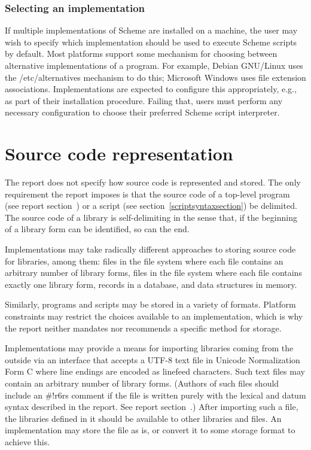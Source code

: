 \documentclass[twoside,twocolumn]{algol60}
\begin{document}
\subsection{Selecting an implementation}
If multiple implementations of Scheme are installed on a machine, the
user may wish to specify which implementation should be used to 
execute Scheme scripts by default.  Most platforms support some 
mechanism for choosing between alternative implementations of a 
program.  For example, Debian GNU/Linux uses the {\cf /etc/alternatives} 
mechanism to do this; Microsoft Windows uses file extension 
associations.  Implementations are expected to configure this 
appropriately, e.g., as part of their installation procedure.
Failing that, users must perform any necessary configuration to 
choose their preferred Scheme script interpreter.

\chapter{Source code representation}
\label{sourcecoderepappendix}

The report does not specify how source code is represented and stored.
The only requirement the report imposes is that the source code of a
top-level program (see report
section~) or a script (see section~\ref{scriptsyntaxsection}) be
delimited.  The source code of a library is self-delimiting in the
sense that, if the beginning of a library form can be identified, so
can the end.

Implementations may take radically different approaches to storing
source code for libraries, among them: files in the file system where
each file contains an arbitrary number of library forms, files in the
file system where each file contains exactly one library form, records
in a database, and data structures in memory.

Similarly, programs and scripts may be stored in a variety of
formats.  Platform constraints may restrict the choices available to
an implementation, which is why the report neither mandates nor
recommends a specific method for storage.

Implementations may provide a means for importing libraries coming
from the outside via an interface that accepts a UTF-8 text file in
Unicode Normalization Form C where line endings are encoded as linefeed
characters.  Such text files may contain an arbitrary number of
library forms.  (Authors of such files should include an
{\cf\#!r6rs} comment if the file is written purely with the lexical
and datum syntax described in the report.  See report
section~.)  After importing such a file, the libraries defined in
it should be available to other libraries and files.  An
implementation may store the file as is, or convert it to some storage
format to achieve this.
\end{document}

